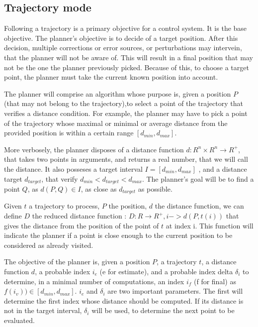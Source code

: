 \newpage

\subsection{Trajectory mode}

Following a trajectory is a primary objective for a control system. It is the base objective.
The planner's objective is to decide of a target position. After this decision, multiple corrections
or error sources, or perturbations may intervein, that the planner will not be aware of. 
This will result in a final position that may not be the one the planner previously picked. 
Because of this, to choose a target point, the planner must take the current known position into account.
\newline 

The planner will comprise an algorithm whose purpose is, given a position $P$ (that may not belong to 
the trajectory),to select a point of the trajectory that verifies a distance condition.
For example, the planner may have to pick a point of the trajectory whose maximal or minimal or average 
distance from the provided position is within a certain range $[d_{min}, d_{max}]$.
\newline

More verbosely, the planner disposes of a distance function $d : R^n \times R^n \rightarrow R^+$, 
that takes two points in arguments, and returns a real number, that we will call the distance.
It also posseses a target interval $I = [d_{min}, d_{max}]$ , and a distance target $d_{target}$, that verify
 $d_{min} < d_{target} < d_{max}$.
The planner's goal will be to find a point $Q$, as $d(P, Q) \in I$, as close as $d_{target}$ as possible.
\newline

Given $t$ a trajectory to process, $P$ the position, $d$ the distance function, we can define $D$ the reduced
 distance function :
$D : R \rightarrow R^+, i -> d(P, t(i))$ 
that gives the distance from the position of the point of $t$ at index i.
This function will indicate the planner if a point is close enough to the current position to be considered
as already visited. 
\newline

The objective of the planner is, given a position $P$, a trajectory $t$, a distance function $d$, 
a probable index $i_e$ (e for estimate), and a probable index delta $\delta _i$ to determine, in a minimal 
number of computations, an index $i_f$ (f for final) as $f(i_v)) \in [d_{min}, d_{max}]$.
$i_e$ and $\delta _i$ are two important parameters. The first will determine the first index whose distance
should be computed. If its distance is not in the target interval, $\delta _i$ will be used, to determine the
next point to be evaluated. 
\newline 

